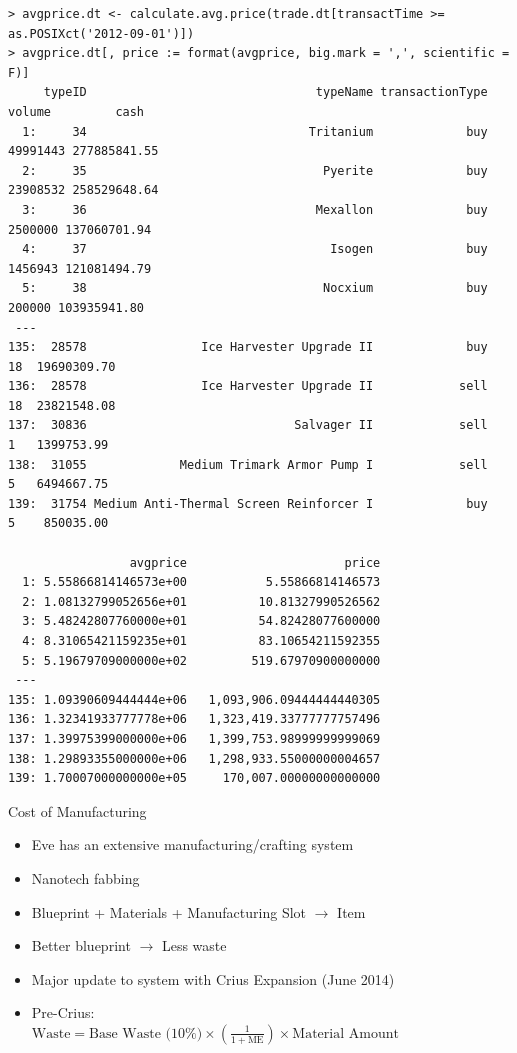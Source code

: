 \documentclass[12pt]{beamer}
\begin{document}
\begin{frame}[fragile]
\begin{verbatim}
> avgprice.dt <- calculate.avg.price(trade.dt[transactTime >= as.POSIXct('2012-09-01')])
> avgprice.dt[, price := format(avgprice, big.mark = ',', scientific = F)]
     typeID                                typeName transactionType   volume         cash
  1:     34                               Tritanium             buy 49991443 277885841.55
  2:     35                                 Pyerite             buy 23908532 258529648.64
  3:     36                                Mexallon             buy  2500000 137060701.94
  4:     37                                  Isogen             buy  1456943 121081494.79
  5:     38                                 Nocxium             buy   200000 103935941.80
 ---
135:  28578                Ice Harvester Upgrade II             buy       18  19690309.70
136:  28578                Ice Harvester Upgrade II            sell       18  23821548.08
137:  30836                             Salvager II            sell        1   1399753.99
138:  31055             Medium Trimark Armor Pump I            sell        5   6494667.75
139:  31754 Medium Anti-Thermal Screen Reinforcer I             buy        5    850035.00

                 avgprice                      price
  1: 5.55866814146573e+00           5.55866814146573
  2: 1.08132799052656e+01          10.81327990526562
  3: 5.48242807760000e+01          54.82428077600000
  4: 8.31065421159235e+01          83.10654211592355
  5: 5.19679709000000e+02         519.67970900000000
 ---
135: 1.09390609444444e+06   1,093,906.09444444440305
136: 1.32341933777778e+06   1,323,419.33777777757496
137: 1.39975399000000e+06   1,399,753.98999999999069
138: 1.29893355000000e+06   1,298,933.55000000004657
139: 1.70007000000000e+05     170,007.00000000000000
\end{verbatim}
\end{frame}


\begin{frame}[fragile]{Cost of Manufacturing}

\begin{itemize}
\item<2-> Eve has an extensive manufacturing/crafting system
\item<3-> Nanotech fabbing
\item<4-> Blueprint + Materials + Manufacturing Slot $\rightarrow$ Item
\item<5-> Better blueprint $\rightarrow$ Less waste
\item<6-> Major update to system with Crius Expansion (June 2014)
\item<7-> Pre-Crius:\\ $\text{Waste} = \text{Base Waste (10\%)} \times \left(\frac{1}{1 + \text{ME}}\right) \times \text{Material Amount}$
\end{itemize}

\end{frame}
\end{document}
